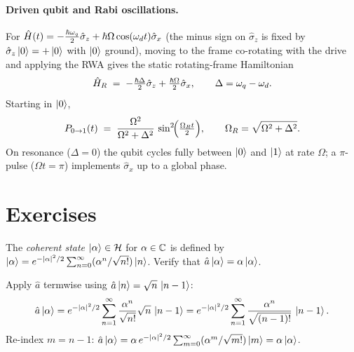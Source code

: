 \begin{chaptersummary}
\paragraph{Driven qubit and Rabi oscillations.}
For
$\hat{H}(t)=-\tfrac{\hbar\omega_q}{2}\hat\sigma_z+\hbar\Omega\cos(\omega_d t)\hat\sigma_x$
(the minus sign on $\hat\sigma_z$ is fixed by
$\hat\sigma_z\ket{0}=+\ket{0}$ with $\ket{0}$ ground), moving to
the frame co-rotating with the drive and applying the RWA gives
the static rotating-frame Hamiltonian
\begin{equation}
\hat{H}_R \;=\; -\tfrac{\hbar\Delta}{2}\hat\sigma_z+\tfrac{\hbar\Omega}{2}\hat\sigma_x,
\qquad \Delta=\omega_q-\omega_d.
\end{equation}
Starting in $\ket{0}$,
\begin{equation}
P_{0\to 1}(t) \;=\; \frac{\Omega^2}{\Omega^2+\Delta^2}\,
\sin^2\!\Bigl(\tfrac{\Omega_R t}{2}\Bigr),
\qquad
\Omega_R=\sqrt{\Omega^2+\Delta^2}.
\end{equation}
On resonance ($\Delta=0$) the qubit cycles fully between $\ket{0}$
and $\ket{1}$ at rate $\Omega$; a $\pi$-pulse ($\Omega t=\pi$)
implements $\hat\sigma_x$ up to a global phase.

\end{chaptersummary}

\section*{Exercises}

\begin{exercise}
The \emph{coherent state} $\ket{\alpha}\in\mathcal{H}$ for $\alpha\in\mathbb{C}$
is defined by
$\ket{\alpha}=e^{-|\alpha|^2/2}\sum_{n=0}^\infty(\alpha^n/\sqrt{n!})\ket{n}$.
Verify that $\hat{a}\ket{\alpha}=\alpha\ket{\alpha}$.
\begin{solution}
Apply $\hat{a}$ termwise using $\hat{a}\ket{n}=\sqrt n\,\ket{n-1}$:
\[
\hat{a}\ket{\alpha}=e^{-|\alpha|^2/2}\sum_{n=1}^\infty\frac{\alpha^n}{\sqrt{n!}}\sqrt{n}\,\ket{n-1}
=e^{-|\alpha|^2/2}\sum_{n=1}^\infty\frac{\alpha^n}{\sqrt{(n-1)!}}\,\ket{n-1}.
\]
Re-index $m=n-1$:
$\hat{a}\ket{\alpha}=\alpha\,e^{-|\alpha|^2/2}\sum_{m=0}^\infty(\alpha^m/\sqrt{m!})\ket{m}
=\alpha\ket{\alpha}$.
\end{solution}
\end{exercise}

